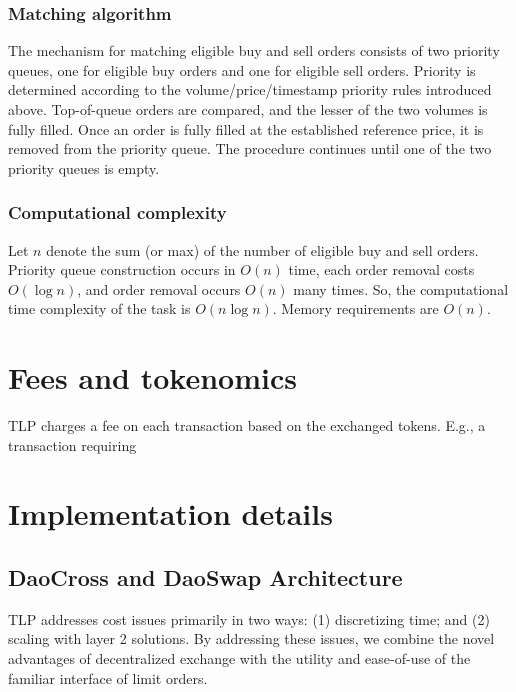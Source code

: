 \documentclass[11pt, reqno]{amsart}
\theoremstyle{definition}
\theoremstyle{remark}
\begin{document}
\subsubsection{Matching algorithm}
The mechanism for matching eligible buy and sell orders consists of two
priority queues, one for eligible buy orders and one for eligible sell orders.
Priority is determined according to the volume/price/timestamp priority rules
introduced above. Top-of-queue orders are compared, and the lesser of the two
volumes is fully filled. Once an order is fully filled at the established
reference price, it is removed from the priority queue. The procedure continues
until one of the two priority queues is empty.

\subsubsection{Computational complexity}
Let $n$ denote the sum (or max) of the number of eligible buy and sell orders.
Priority queue construction occurs in $O(n)$ time, each order removal costs
$O(\log n)$, and order removal occurs $O(n)$ many times. So, the computational
time complexity of the task is $O(n \log n)$. Memory requirements are $O(n)$.


\section{Fees and tokenomics}
TLP charges a fee on each transaction based on the exchanged tokens.
E.g., a transaction requiring

\section{Implementation details}

\subsection{DaoCross and DaoSwap Architecture}
TLP addresses cost issues primarily in two ways: (1) discretizing time; and
(2) scaling with layer 2 solutions. By addressing these issues, we combine the
novel advantages of decentralized exchange with the utility and ease-of-use of
the familiar interface of limit orders.
\end{document}
